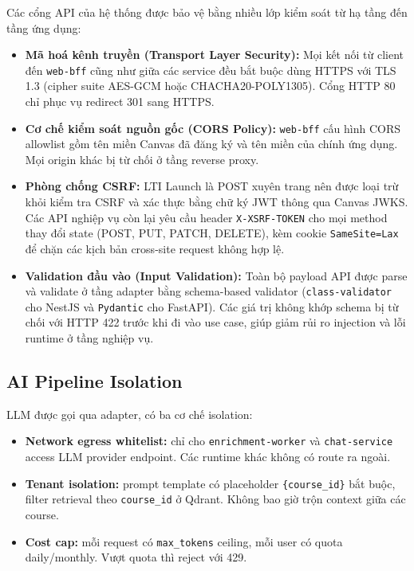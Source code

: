 Các cổng API của hệ thống được bảo vệ bằng nhiều lớp kiểm soát từ hạ
tầng đến tầng ứng dụng:

\begin{itemize}
    \item \textbf{Mã hoá kênh truyền (Transport Layer Security):} Mọi
          kết nối từ client đến \texttt{web-bff} cũng như giữa các service
          đều bắt buộc dùng HTTPS với TLS 1.3 (cipher suite AES-GCM hoặc
          CHACHA20-POLY1305). Cổng HTTP 80 chỉ phục vụ redirect 301 sang
          HTTPS.
    \item \textbf{Cơ chế kiểm soát nguồn gốc (CORS Policy):} \texttt{web-bff}
          cấu hình CORS allowlist gồm tên miền Canvas đã đăng ký và tên
          miền của chính ứng dụng. Mọi origin khác bị từ chối ở tầng
          reverse proxy.
    \item \textbf{Phòng chống CSRF:} LTI Launch là POST xuyên trang nên
          được loại trừ khỏi kiểm tra CSRF và xác thực bằng chữ ký JWT
          thông qua Canvas JWKS. Các API nghiệp vụ còn lại yêu cầu header
          \texttt{X-XSRF-TOKEN} cho mọi method thay đổi state (POST, PUT,
          PATCH, DELETE), kèm cookie \texttt{SameSite=Lax} để chặn các
          kịch bản cross-site request không hợp lệ.
    \item \textbf{Validation đầu vào (Input Validation):} Toàn bộ payload
          API được parse và validate ở tầng adapter bằng schema-based
          validator (\texttt{class-validator} cho NestJS và
          \texttt{Pydantic} cho FastAPI). Các giá trị không khớp schema
          bị từ chối với HTTP 422 trước khi đi vào use case, giúp giảm
          rủi ro injection và lỗi runtime ở tầng nghiệp vụ.
\end{itemize}

\subsection{AI Pipeline Isolation}

LLM được gọi qua adapter, có ba cơ chế isolation:

\begin{itemize}
    \item \textbf{Network egress whitelist:} chỉ cho
          \texttt{enrichment-worker} và \texttt{chat-service} access LLM
          provider endpoint. Các runtime khác không có route ra ngoài.
    \item \textbf{Tenant isolation:} prompt template có placeholder
          \texttt{\{course\_id\}} bắt buộc, filter retrieval theo
          \texttt{course\_id} ở Qdrant. Không bao giờ trộn context giữa các
          course.
    \item \textbf{Cost cap:} mỗi request có \texttt{max\_tokens} ceiling,
          mỗi user có quota daily/monthly. Vượt quota thì reject với 429.
\end{itemize}

